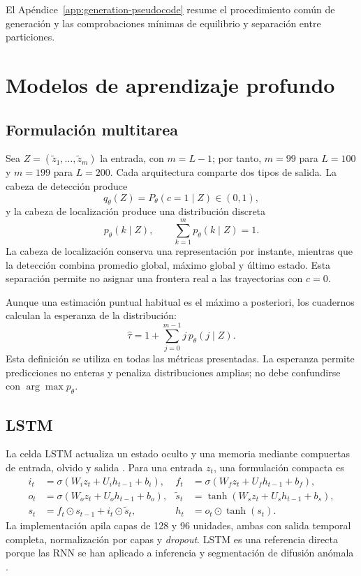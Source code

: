 \documentclass[a4paper,12pt]{article}
\begin{document}
El Apéndice~\ref{app:generation-pseudocode} resume el procedimiento común de generación y las comprobaciones mínimas de equilibrio y separación entre particiones.

\section{Modelos de aprendizaje profundo}

\subsection{Formulación multitarea}

Sea $Z=(\widetilde z_1,\ldots,\widetilde z_m)$ la entrada, con $m=L-1$; por tanto, $m=99$ para $L=100$ y $m=199$ para $L=200$. Cada arquitectura comparte dos tipos de salida. La cabeza de detección produce
\begin{equation}
  q_{\theta}(Z)=P_{\theta}(c=1\mid Z)\in(0,1),
  \label{eq:detection-output}
\end{equation}
y la cabeza de localización produce una distribución discreta
\begin{equation}
  p_{\theta}(k\mid Z),\qquad
  \sum_{k=1}^{m}p_{\theta}(k\mid Z)=1.
  \label{eq:localization-output}
\end{equation}
La cabeza de localización conserva una representación por instante, mientras que la detección combina promedio global, máximo global y último estado. Esta separación permite no asignar una frontera real a las trayectorias con $c=0$.

Aunque una estimación puntual habitual es el máximo a posteriori, los cuadernos calculan la esperanza de la distribución:
\begin{equation}
  \widehat\tau=1+\sum_{j=0}^{m-1}j\,p_{\theta}(j\mid Z).
  \label{eq:soft-position}
\end{equation}
Esta definición se utiliza en todas las métricas presentadas. La esperanza permite predicciones no enteras y penaliza distribuciones amplias; no debe confundirse con $\arg\max p_{\theta}$.

\subsection{LSTM}

La celda LSTM actualiza un estado oculto y una memoria mediante compuertas de entrada, olvido y salida \cite{hochreiter1997lstm}. Para una entrada $z_t$, una formulación compacta es
\begin{align}
 i_t&=\sigma(W_i z_t+U_i h_{t-1}+b_i), &
 f_t&=\sigma(W_f z_t+U_f h_{t-1}+b_f),\\
 o_t&=\sigma(W_o z_t+U_o h_{t-1}+b_o), &
 \widetilde s_t&=\tanh(W_s z_t+U_s h_{t-1}+b_s),\\
 s_t&=f_t\odot s_{t-1}+i_t\odot\widetilde s_t, &
 h_t&=o_t\odot\tanh(s_t).
\end{align}
La implementación apila capas de 128 y 96 unidades, ambas con salida temporal completa, normalización por capas y \emph{dropout}. LSTM es una referencia directa porque las RNN se han aplicado a inferencia y segmentación de difusión anómala \cite{bo2019measurement,argun2021classification}.
\end{document}

